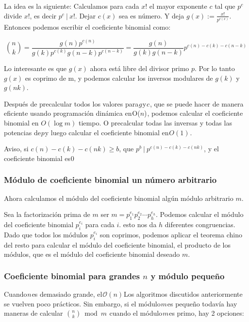 La idea es la siguiente: Calculamos para cada $x!$ el mayor exponente $c$ tal que $p^c$ divide $x!$, es decir $p^c ~|~ x!$. Dejar $c(x)$ sea es número. Y deja $g(x) := \frac{x!}{p^{c(x)}}$. Entonces podemos escribir el coeficiente binomial como:

$$\binom n k = \frac {g(n) p^{c(n)}} {g(k) p^{c(k)} g(n-k) p^{c(n-k)}} = \frac {g(n)} {g(k) g(n-k)}p^{c(n) - c(k) - c(n-k)}$$

Lo interesante es que $g(x)$ ahora está libre del divisor primo $p$. Por lo tanto $g(x)$ es coprimo de m, y podemos calcular los inversos modulares de $g(k)$ y $g(nk)$.

Después de precalcular todos los valores para $g$ y $c$ , que se puede hacer de manera eficiente usando programación dinámica en O($n$) , podemos calcular el coeficiente binomial en $O(\log m)$ tiempo. O precalcular todas las inversas y todas las potencias de $p$ y luego calcular el coeficiente binomial en $O(1)$ .

Aviso, si $c(n) - c(k) - c(nk) \ge b$, que $p^b ~|~ p^{c(n) - c(k) - c(nk)}$, y el coeficiente binomial es $0$

\subsubsection{Módulo de coeficiente binomial un número arbitrario}

Ahora calculamos el módulo del coeficiente binomial algún módulo arbitrario $m$.

Sea la factorización prima de $m$ ser $m=p_1^{e_1} p_2^{e_2} \cdots p_h^{e_h}$. Podemos calcular el módulo del coeficiente binomial $p_i^{e_i}$ para cada $i$. esto nos da $h$ diferentes 
congruencias. Dado que todos los módulos $p_i^{e_i}$ son coprimos, podemos aplicar el teorema chino del resto para calcular el módulo del coeficiente binomial, el producto de los módulos, que es 
el módulo del coeficiente binomial deseado $m$.

\subsubsection{Coeficiente binomial para grandes $n$ y módulo pequeño}

Cuando $n$ es demasiado grande, el $\mathcal{O}(n)$ Los algoritmos discutidos anteriormente se vuelven poco prácticos. Sin embargo, si el módulo $m$ es pequeño todavía hay maneras de calcular 
$\binom{n}{k} \bmod m$  cuando el módulo $m$ es primo, hay 2 opciones:


